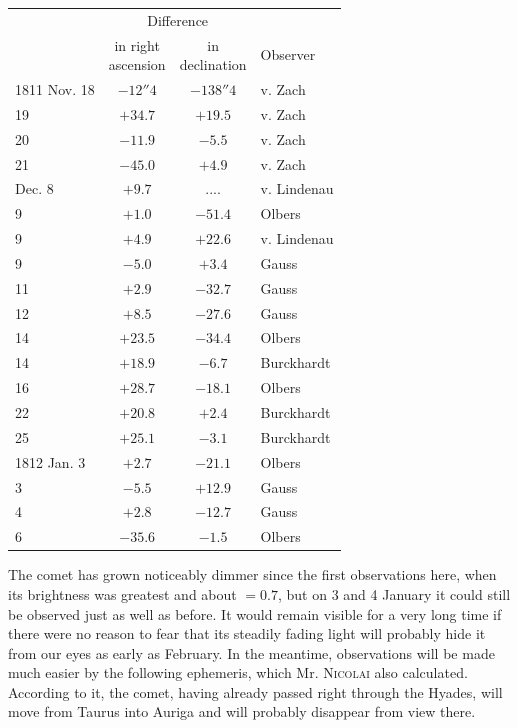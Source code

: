 \begin{center}
\fontsize{10}{12}\selectfont\setlength{\tabcolsep}{5pt}\renewcommand{\arraystretch}{1.15}\begin{tabular}{l|c|c|l}
 & \multicolumn{2}{c|}{Difference} & \\
 & \shortstack{in right\\ascension} & \shortstack{in\\declination} & Observer \\
\hline
1811 Nov. 18 & $-12''4$ & $-138''4$ & v. Zach \\
19 & $+34.7$ & $+19.5$ & v. Zach \\
20 & $-11.9$ & $-5.5$ & v. Zach \\
21 & $-45.0$ & $+4.9$ & v. Zach \\
Dec. 8 & $+9.7$ & .\;.\;.\;. & v. Lindenau \\
9 & $+1.0$ & $-51.4$ & Olbers \\
9 & $+4.9$ & $+22.6$ & v. Lindenau \\
9 & $-5.0$ & $+3.4$ & Gauss \\
11 & $+2.9$ & $-32.7$ & Gauss \\
12 & $+8.5$ & $-27.6$ & Gauss \\
14 & $+23.5$ & $-34.4$ & Olbers \\
14 & $+18.9$ & $-6.7$ & Burckhardt \\
16 & $+28.7$ & $-18.1$ & Olbers \\
22 & $+20.8$ & $+2.4$ & Burckhardt \\
25 & $+25.1$ & $-3.1$ & Burckhardt \\
1812 Jan. 3 & $+2.7$ & $-21.1$ & Olbers \\
3 & $-5.5$ & $+12.9$ & Gauss \\
4 & $+2.8$ & $-12.7$ & Gauss \\
6 & $-35.6$ & $-1.5$ & Olbers \\
\end{tabular}
\end{center}

\par\indent The comet has grown noticeably dimmer since the first observations here, when its brightness was greatest and about $= 0.7$, but on 3 and 4 January it could still be observed just as well as before. It would remain visible for a very long time if there were no reason to fear that its steadily fading light will probably hide it from our eyes as early as February. In the meantime, observations will be made much easier by the following ephemeris, which Mr. \textsc{Nicolai} also calculated. According to it, the comet, having already passed right through the Hyades, will move from Taurus into Auriga and will probably disappear from view there.
